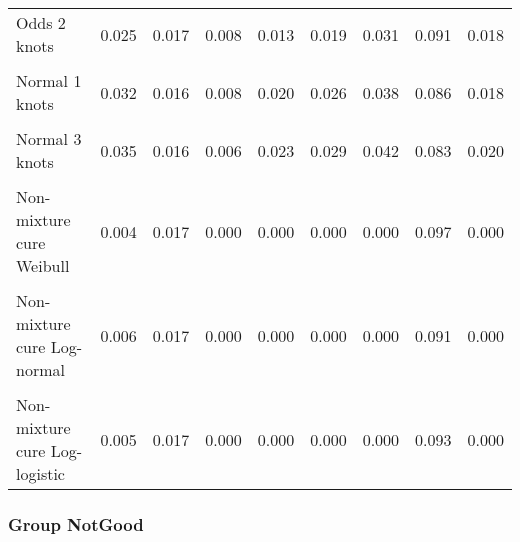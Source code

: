 \documentclass[
]{article}
\begin{document}
\begin{table}[H]
{\begin{tabular}[t]{lrrrrrrrr}
Odds 2 knots & 0.025 & 0.017 & 0.008 & 0.013 & 0.019 & 0.031 & 0.091 & 0.018\\
\cellcolor{gray!10}{Odds 3 knots} & \cellcolor{gray!10}{0.031} & \cellcolor{gray!10}{0.019} & \cellcolor{gray!10}{0.006} & \cellcolor{gray!10}{0.017} & \cellcolor{gray!10}{0.024} & \cellcolor{gray!10}{0.041} & \cellcolor{gray!10}{0.084} & \cellcolor{gray!10}{0.024}\\
Normal 1 knots & 0.032 & 0.016 & 0.008 & 0.020 & 0.026 & 0.038 & 0.086 & 0.018\\
\cellcolor{gray!10}{Normal 2 knots} & \cellcolor{gray!10}{0.027} & \cellcolor{gray!10}{0.016} & \cellcolor{gray!10}{0.008} & \cellcolor{gray!10}{0.016} & \cellcolor{gray!10}{0.021} & \cellcolor{gray!10}{0.031} & \cellcolor{gray!10}{0.093} & \cellcolor{gray!10}{0.015}\\
Normal 3 knots & 0.035 & 0.016 & 0.006 & 0.023 & 0.029 & 0.042 & 0.083 & 0.020\\
\cellcolor{gray!10}{Mixture cure Weibull} & \cellcolor{gray!10}{0.004} & \cellcolor{gray!10}{0.017} & \cellcolor{gray!10}{0.000} & \cellcolor{gray!10}{0.000} & \cellcolor{gray!10}{0.000} & \cellcolor{gray!10}{0.000} & \cellcolor{gray!10}{0.097} & \cellcolor{gray!10}{0.000}\\
Non-mixture cure Weibull & 0.004 & 0.017 & 0.000 & 0.000 & 0.000 & 0.000 & 0.097 & 0.000\\
\cellcolor{gray!10}{Mixture cure Log-normal} & \cellcolor{gray!10}{0.005} & \cellcolor{gray!10}{0.017} & \cellcolor{gray!10}{0.000} & \cellcolor{gray!10}{0.000} & \cellcolor{gray!10}{0.000} & \cellcolor{gray!10}{0.000} & \cellcolor{gray!10}{0.091} & \cellcolor{gray!10}{0.000}\\
Non-mixture cure Log-normal & 0.006 & 0.017 & 0.000 & 0.000 & 0.000 & 0.000 & 0.091 & 0.000\\
\cellcolor{gray!10}{Mixture cure Log-logistic} & \cellcolor{gray!10}{0.005} & \cellcolor{gray!10}{0.017} & \cellcolor{gray!10}{0.000} & \cellcolor{gray!10}{0.000} & \cellcolor{gray!10}{0.000} & \cellcolor{gray!10}{0.000} & \cellcolor{gray!10}{0.093} & \cellcolor{gray!10}{0.000}\\
Non-mixture cure Log-logistic & 0.005 & 0.017 & 0.000 & 0.000 & 0.000 & 0.000 & 0.093 & 0.000\\
\bottomrule
\end{tabular}}
\end{table}

\clearpage

\subsubsection{Group NotGood}\label{group-notgood}
\end{document}
